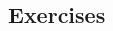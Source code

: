\begin{frame}[fragile]
\begin{columns}[t]
\begin{column}[T]{6.25cm}
\end{column}
  \begin{column}[T]{5.25cm}
\end{column}
\end{columns}

\end{frame}



\subsection*{Exercises}

